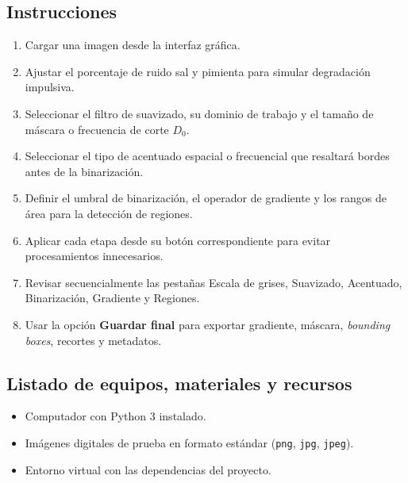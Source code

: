\documentclass[11pt]{article}
\begin{document}
\subsection{Instrucciones}
\begin{enumerate}
    \item Cargar una imagen desde la interfaz gráfica.
    \item Ajustar el porcentaje de ruido sal y pimienta para simular degradación impulsiva.
    \item Seleccionar el filtro de suavizado, su dominio de trabajo y el tamaño de máscara o frecuencia de corte $D_0$.
    \item Seleccionar el tipo de acentuado espacial o frecuencial que resaltará bordes antes de la binarización.
    \item Definir el umbral de binarización, el operador de gradiente y los rangos de área para la detección de regiones.
    \item Aplicar cada etapa desde su botón correspondiente para evitar procesamientos innecesarios.
    \item Revisar secuencialmente las pestañas Escala de grises, Suavizado, Acentuado, Binarización, Gradiente y Regiones.
    \item Usar la opción \textbf{Guardar final} para exportar gradiente, máscara, \textit{bounding boxes}, recortes y metadatos.
\end{enumerate}

\subsection{Listado de equipos, materiales y recursos}
\begin{itemize}
    \item Computador con Python 3 instalado.
    \item Imágenes digitales de prueba en formato estándar (\texttt{png}, \texttt{jpg}, \texttt{jpeg}).
    \item Entorno virtual con las dependencias del proyecto.
\end{itemize}
\end{document}

